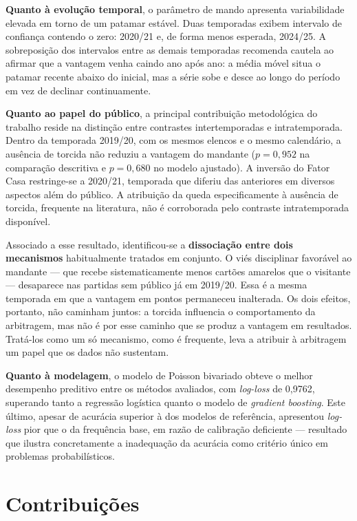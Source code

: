 \textbf{Quanto à evolução temporal}, o parâmetro de mando apresenta
variabilidade elevada em torno de um patamar estável. Duas temporadas exibem
intervalo de confiança contendo o zero: 2020/21 e, de forma menos esperada,
2024/25. A sobreposição dos intervalos entre as demais temporadas recomenda
cautela ao afirmar que a vantagem venha caindo ano após ano: a média móvel
situa o patamar recente abaixo do inicial, mas a série sobe e desce ao longo do
período em vez de declinar continuamente.

\textbf{Quanto ao papel do público}, a principal contribuição metodológica do
trabalho reside na distinção entre contrastes intertemporadas e
intratemporada. Dentro da temporada 2019/20, com os mesmos elencos e o mesmo
calendário, a ausência de torcida não reduziu a vantagem do mandante
($p = 0{,}952$ na comparação descritiva e $p = 0{,}680$ no modelo ajustado). A
inversão do Fator Casa restringe-se a 2020/21, temporada que diferiu das
anteriores em diversos aspectos além do público. A atribuição da queda
especificamente à ausência de torcida, frequente na literatura, não é
corroborada pelo contraste intratemporada disponível.

Associado a esse resultado, identificou-se a \textbf{dissociação entre dois
mecanismos} habitualmente tratados em conjunto. O viés disciplinar favorável ao
mandante — que recebe sistematicamente menos cartões amarelos que o visitante —
desaparece nas partidas sem público já em 2019/20. Essa é a mesma temporada em
que a vantagem em pontos permaneceu inalterada. Os dois efeitos, portanto, não caminham
juntos: a torcida influencia o comportamento da arbitragem, mas não é por esse
caminho que se produz a vantagem em resultados. Tratá-los como um só mecanismo,
como é frequente, leva a atribuir à arbitragem um papel que os dados não
sustentam.

\textbf{Quanto à modelagem}, o modelo de Poisson bivariado obteve o melhor
desempenho preditivo entre os métodos avaliados, com \textit{log-loss} de
0,9762, superando tanto a regressão logística quanto o modelo de \textit{gradient
boosting}. Este último, apesar de acurácia superior à dos modelos de referência,
apresentou \textit{log-loss} pior que o da frequência base, em razão de
calibração deficiente — resultado que ilustra concretamente a inadequação da
acurácia como critério único em problemas probabilísticos.

\section{Contribuições}\label{sec:contribuicoes}

